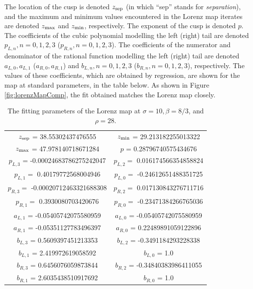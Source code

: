 The location of the cusp is denoted $z_{\rm sep}$ (in which ``sep'' stands 
for \emph{separation}), and the maximum and minimum values encountered 
in the Lorenz map iterates are denoted $z_{\rm max}$ and $z_{\rm min}$, respectively. The exponent of the cusp is denoted $p$. The coefficients of the cubic polynomial modelling the left (right) tail are  denoted $p_{L,n}, n = 0,1,2,3$ ($p_{R,n}, n = 0,1,2,3$). The coefficients of the numerator and denominator of the rational function modelling the left (right) tail are denoted $a_{L,0}, a_{L,1}$ ($a_{R,0}, a_{R,1}$) and $b_{L,n}, n=0,1,2,3$ ($b_{R,n}, n=0,1,2,3$), respectively. The values of these coefficients, which are obtained by
regression, are shown for the map at standard parameters, in the table below. As shown in Figure \ref{fig:lorenzMapComp}, the fit obtained matches the Lorenz map closely.
\begin{table}[H]
    \centering
    \begin{tabular}{|c|c|}
    \hline 
         $z_{\rm sep}$ = 38.55302437476555 &
         $z_{\rm min}$ =  29.213182255013322 \\ 
         $z_{\rm max}$ =  47.978140718671284 & 
         $p$ = 0.28796740575434676   \\
         $p_{L,3}$ = -0.00024683786275242047 & $p_{L,2} = $ 
         0.016174566354858824 \\
         $p_{L,1} = $ 0.40179772568004946 & 
         $p_{L, 0}  = $ -0.24612651488351725 \\
         $p_{R,3} = $ -0.00020712463321688308 & 
         $p_{R,2} = $ 0.017130843276711716 \\
         $p_{R, 1} = $ 0.3930080703420676 & 
         $p_{R, 0} = $ -0.23471384266765036 \\
         $a_{L,1}$ = -0.05405742075580959 & $a_{L,0}$ = -0.05405742075580959 \\
         $a_{R,1}$ = -0.05351127783496397 & $a_{R,0}$ = 0.22489891059122896 \\
         $b_{L,3}$ = 0.5609397451213353 & $b_{L,2}$ = -0.3491184293228338 \\  $b_{L,1}$ = 2.419972619058592 & $b_{L,0}$ = 1.0 \\
         $b_{R,3}$ = 0.6456076059873844 & $b_{R,2}$ = -0.34840383986411055 \\ $b_{R,1}$ = 2.6035438510917692 &  $b_{R,0}$ = 1.0 \\
         \hline
    \end{tabular}
    \caption{The fitting parameters of the Lorenz map at $\sigma = 10, \beta = 8/3$, and $\rho = 28.$}
    \label{tab:lorenzFit}
\end{table}

